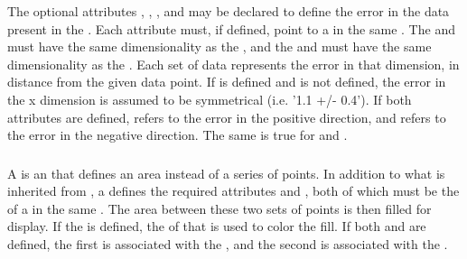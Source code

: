 \begin{blockChanged}
The optional attributes , , , and  may be declared to define the error in the data present in the \Curve.  Each attribute must, if defined, point to a \DataGenerator in the same \SedDocument.  The  and  must have the same dimensionality as the , and the  and  must have the same dimensionality as the .  Each set of data represents the error in that dimension, in distance from the given data point.  If  is defined and  is not defined, the error in the x dimension is assumed to be symmetrical (i.e. '1.1 +/- 0.4').  If both attributes are defined,  refers to the error in the positive direction, and  refers to the error in the negative direction.  The same is true for  and .


\subsubsection{}
\label{class:shadedArea}
A \ShadedArea is an \AbstractCurve that defines an area instead of a series of points.  In addition to what is inherited from \AbstractCurve, a \ShadedArea defines the required attributes  and , both of which must be the  of a \DataGenerator in the same \SedDocument.  The area between these two sets of points is then filled for display.  If the  is defined, the \Fill of that \Style is used to color the fill.  If both  and  are defined, the first is associated with the , and the second is associated with the .

\end{blockChanged}


